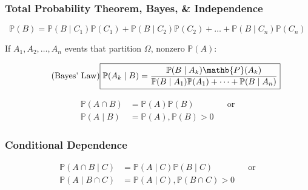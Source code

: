 \documentclass[10pt]{article}
\begin{document}

\subsubsection*{Total Probability Theorem, Bayes, \& Independence}

\begin{equation}
  \tag{Total Probability Theorem}
  \boxed{
    \mathbb{P}(B) = \mathbb{P}(B \mid C_1) \mathbb{P}(C_1) +
    \mathbb{P}(B \mid C_2) \mathbb{P}(C_2) + \dots + \mathbb{P}(B \mid
    C_n) \mathbb{P}(C_n)
  }
\end{equation}


\begin{multicols}{2}
  If $A_1, A_2, \dots, A_n$ events that partition $\Omega$, nonzero
  $\mathbb{P}(A)$:

\begin{equation}
  \tag{Bayes' Law}
  \boxed{
    \mathbb{P}(A_k \mid B) =
    \frac{\mathbb{P}(B \mid A_k) \mathb{P}(A_k)}
    {\mathbb{P}(B \mid A_1) \mathbb{P}(A_1) + \dots + \mathbb{P}(B
      \mid A_n)}
  }
\end{equation}

\columnbreak

\begin{equation}
  \tag{Independence Def}
  \boxed{
    \begin{aligned}
      \mathbb{P}(A \cap B)
      &= \mathbb{P}(A) \mathbb{P}(B)
      && \text{or} \\
      \mathbb{P}(A \mid B)
      &= \mathbb{P}(A), \mathbb{P}(B) > 0
    \end{aligned}
  }
\end{equation}
\end{multicols}


\subsubsection*{Conditional Dependence}

\begin{equation}
  \tag{Conditional Independence Def}
  \boxed{
    \begin{aligned}
      \mathbb{P}(A \cap B \mid C)
      &= \mathbb{P}(A \mid C) \mathbb{P}(B \mid C)
      && \text{or} \\
      \mathbb{P}(A \mid B \cap C)
      &= \mathbb{P}(A \mid C), \mathbb{P}(B \cap C) > 0
    \end{aligned}
  }
\end{equation}
\end{document}
